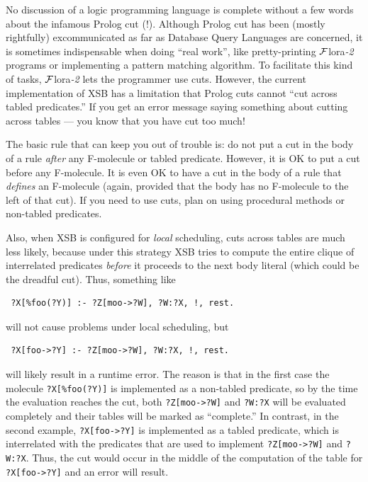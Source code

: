 \documentclass[11pt]{article}
\newcommand{\FLORA}{{\mbox{\sc ${\cal F}${lora}\rm\emph{-2}}}\xspace}
\begin{document}
\index{cut!in \FLORA}
No discussion of a logic programming language is complete without a few
words about the infamous Prolog cut (!). Although Prolog cut has been
(mostly rightfully) excommunicated as far as Database Query Languages are
concerned, it is sometimes indispensable when doing ``real work'', like
pretty-printing \FLORA programs or implementing a pattern matching
algorithm.  To facilitate this kind of tasks, \FLORA lets the programmer
use cuts.  However, the current implementation of XSB has a limitation that
Prolog cuts cannot ``cut across tabled predicates.''  If you get an error
message saying something about cutting across tables --- you know that
you have cut too much!

The basic rule that can keep you out of trouble is: do not put a cut in the
body of a rule \emph{after} any F-molecule or tabled 
predicate. However, it is OK to put a cut before any F-molecule. It is
even OK to have a cut in the body of a rule that \emph{defines} an
F-molecule (again, provided that the body has no F-molecule to the left of
that cut). If you need to use cuts, plan on using procedural methods or
non-tabled predicates.

Also, when XSB is configured for \emph{local} scheduling, cuts across
tables are much less likely, because under this strategy XSB tries to
compute the entire clique of interrelated predicates \emph{before} it
proceeds to the next body literal (which could be the dreadful cut).
Thus, something like
\begin{verbatim}
 ?X[%foo(?Y)] :- ?Z[moo->?W], ?W:?X, !, rest.  
\end{verbatim}
will not cause problems under local scheduling, but
\begin{verbatim}
 ?X[foo->?Y] :- ?Z[moo->?W], ?W:?X, !, rest.  
\end{verbatim}
will likely result in a runtime error. The reason is that in the first case
the molecule \verb|?X[%foo(?Y)]| is implemented as a non-tabled predicate, so
by the time the evaluation reaches the cut, both \verb|?Z[moo->?W]| and 
{\tt ?W:?X} will be evaluated completely and their tables will be marked as
``complete.'' In contrast, in the second example, \verb|?X[foo->?Y]| is
implemented as a tabled predicate, which is interrelated with the
predicates that are used to implement \verb|?Z[moo->?W]| and 
{\tt ?W:?X}. Thus, the cut would occur in the middle of the computation of
the table for \verb|?X[foo->?Y]| and an error will result.
\end{document}
